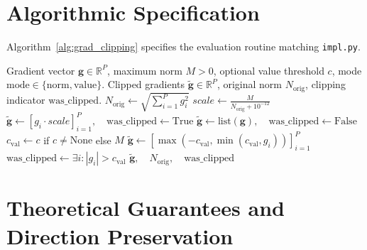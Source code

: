 \documentclass[11pt]{article}
\begin{document}
\section{Algorithmic Specification}
\label{sec:algorithm}

Algorithm~\ref{alg:grad_clipping} specifies the evaluation routine matching \texttt{impl.py}.

\begin{algorithm}[H]
\caption{Gradient Norm and Value Clipping Routine}
\label{alg:grad_clipping}
\begin{algorithmic}[1]
\Require Gradient vector $\mathbf{g} \in \mathbb{R}^P$, maximum norm $M > 0$, optional value threshold $c$, mode $\mathrm{mode} \in \{\text{norm}, \text{value}\}$.
\Ensure Clipped gradients $\tilde{\mathbf{g}} \in \mathbb{R}^P$, original norm $N_{\mathrm{orig}}$, clipping indicator $\mathrm{was\_clipped}$.
\State $N_{\mathrm{orig}} \gets \sqrt{\sum_{i=1}^P g_i^2}$
        \State $scale \gets \frac{M}{N_{\mathrm{orig}} + 10^{-12}}$
        \State $\tilde{\mathbf{g}} \gets [g_i \cdot scale]_{i=1}^P, \quad \mathrm{was\_clipped} \gets \text{True}$
    \Else
        \State $\tilde{\mathbf{g}} \gets \text{list}(\mathbf{g}), \quad \mathrm{was\_clipped} \gets \text{False}$
    \EndIf
\Else
    \State $c_{\mathrm{val}} \gets c$ if $c \neq \text{None}$ else $M$
    \State $\tilde{\mathbf{g}} \gets [\max(-c_{\mathrm{val}}, \min(c_{\mathrm{val}}, g_i))]_{i=1}^P$
    \State $\mathrm{was\_clipped} \gets \exists i : |g_i| > c_{\mathrm{val}}$
\EndIf
\State \Return $\tilde{\mathbf{g}}, \quad N_{\mathrm{orig}}, \quad \mathrm{was\_clipped}$
\end{algorithmic}
\end{algorithm}

\section{Theoretical Guarantees and Direction Preservation}
\label{sec:guarantees}
\end{document}

